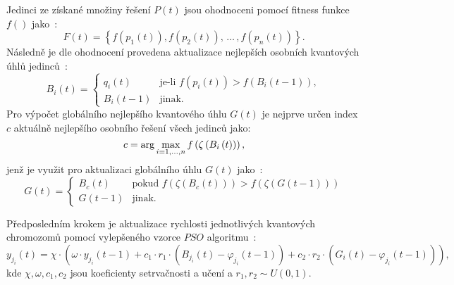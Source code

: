 Jedinci ze získané množiny řešení $P\left(t\right)$ jsou ohodnoceni pomocí fitness funkce $f\left(\right)$ jako~\cite{qse}: 
\begin{equation*}
    F\left(t\right) = \left\{ f\left(p_1\left(t\right)\right), f\left(p_2\left(t\right)\right), \,\dots\,, f\left(p_n\left(t\right)\right) \right\}.
\end{equation*}
Následně je dle ohodnocení provedena aktualizace nejlepších osobních kvantových úhlů jedinců~\cite{qse}:
\begin{equation}\label{eq:pers-best}
    B_i\left(t\right) =
    \begin{cases}
        q_i\left(t\right)   & \text{je-li } f\left(p_i\left(t\right)\right) > f\left(B_i\left(t-1\right)\right), \\
        B_i\left(t-1\right) & \text{jinak.}
    \end{cases}
\end{equation}
Pro výpočet globálního nejlepšího kvantového úhlu $G\left(t\right)$ je nejprve určen index $c$ aktuálně nejlepšího osobního řešení všech jedinců jako:
\begin{equation*}
    c = \arg\max_{i=1,\dots,n} f\left(\zeta\left(B_i\left(t\right)\right)\right),\\[5pt]
\end{equation*}
jenž je využit pro aktualizaci globálního úhlu $G\left(t\right)$ jako~\cite{qse}:
\begin{equation}\label{eq:glob-best}
    G\left(t\right) =
    \begin{cases}
        B_c\left(t\right)   & \text{pokud } f\left(\zeta\left(B_c\left(t\right)\right)\right) > f\left(\zeta\left(G\left(t-1\right)\right)\right) \\
        G\left(t-1\right)   & \text{jinak.}
    \end{cases}
\end{equation}

Předposledním krokem je aktualizace rychlosti jednotlivých kvantových chromozomů pomocí vylepšeného vzorce $PSO$ algoritmu~\cite{qse}: 
\begin{equation}\label{eq:qse-velocity}
    y_{j_i}\left(t\right) = \chi \cdot
    \left( \omega \cdot y_{j_i}\left(t-1\right) 
        + c_1 \cdot r_1 \cdot \left(B_{j_i}\left(t\right) - \varphi_{j_i}\left(t-1\right) \right)
        + c_2 \cdot r_2 \cdot \left( G_{i}\left(t\right) - \varphi_{j_i}\left(t-1\right) \right)\right),
\end{equation}
kde $\chi, \omega, c_1 , c_2$ jsou koeficienty setrvačnosti a učení a $r_1,r_2\sim U\left(0,1\right)$.  

